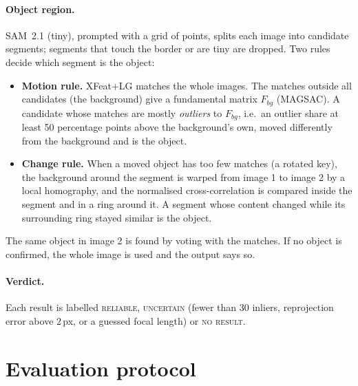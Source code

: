 \documentclass[11pt,a4paper]{article}
\begin{document}
\paragraph{Object region.} SAM~2.1 \cite{sam2} (tiny), prompted with a grid of points, splits each
image into candidate segments; segments that touch the border or are tiny are dropped. Two rules
decide which segment is the object:
\begin{itemize}
  \item \textbf{Motion rule.} XFeat+LG matches the whole images. The matches outside all candidates
        (the background) give a fundamental matrix $F_{bg}$ (MAGSAC). A candidate whose matches are
        mostly \emph{outliers} to $F_{bg}$, i.e.\ an outlier share at least 50 percentage points above the background's own,
        moved differently from the background and is the object.
  \item \textbf{Change rule.} When a moved object has too few matches (a rotated key), the
        background around the segment is warped from image 1 to image 2 by a local homography, and the
        normalised cross-correlation is compared inside the segment and in a ring around it. A
        segment whose content changed while its surrounding ring stayed similar is the object.
\end{itemize}
The same object in image 2 is found by voting with the matches. If no object is confirmed, the
whole image is used and the output says so.

\paragraph{Verdict.} Each result is labelled \textsc{reliable}, \textsc{uncertain} (fewer than 30
inliers, reprojection error above 2\,px, or a guessed focal length) or \textsc{no result}.

\section{Evaluation protocol}
\end{document}
